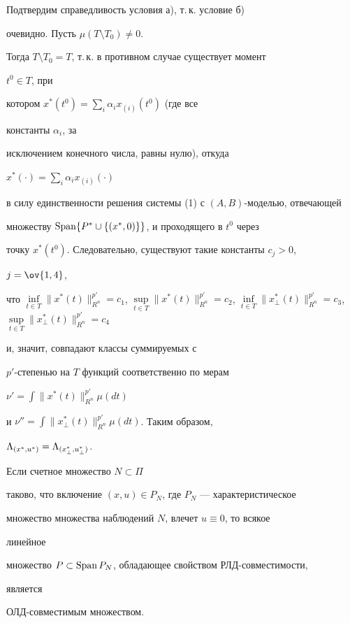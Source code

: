  


\begin{pf} 


Подтвердим справедливость условия а), т.\,к. условие б) 


очевидно. Пусть $\mu(T\setminus T_0)\ne0$. 


Тогда $T\setminus T_0=T$, т.\,к. в противном случае существует момент 


$t^0\in T$, при 


котором $x^*(t^0)=\sum\limits_i\alpha_i x_{(i)}(t^0)$ (где все 


константы $\alpha_i$, за 


исключением конечного числа, равны нулю), откуда 


$x^*(\cdot)=\sum\limits_i\alpha_i x_{(i)}(\cdot)$ 


в силу единственности решения системы (1) с $(A,B)$-моделью, отвечающей 


множеству $\operatorname{Span}\{P^*\cup\{(x^*,0)\}\}$, и проходящего в $t^0$ через 


точку $x^*(t^0)$. Следовательно, существуют такие константы $c_j>0$, 


$j=\ov{1,4}$, 


что $\inf\limits_{t\in T}\|x^*(t)\|^{p'}_{R^n}=c_1$, $\sup\limits_{t\in 


T}\|x^*(t)\|^{p'}_{R^n}=c_2$, $\inf\limits_{t\in 


T}\|x^*_\bot(t)\|^{p'}_{R^n}=c_3$, $\sup\limits_{t\in 


T}\|x^*_\bot(t)\|^{p'}_{R^n}=c_4$ 


и, значит, совпадают классы суммируемых с 


$p'$-степенью на $T$ функций соответственно по мерам 


$\nu'=\int\|x^*(t)\|^{p'}_{R^n}\mu(dt)$ 


и $\nu''=\int\|x^*_\bot(t)\|^{p'}_{R^n}\mu(dt)$. Таким образом, 


$\Lambda_{{(x^*_{},u^*_{})}}=\Lambda_{{(x^*_{\bot},u^*_{\bot})}}$. 


\end{pf} 


 


\begin{assrt} 


Если счетное множество $N\subset\Pi$ 


таково, что включение $(x,u)\in P_N$, где $P_N$ --- характеристическое 


множество множества наблюдений $N$, влечет $u\equiv0$, то всякое 


линейное 


множество $P\subset\operatorname{Span} P_N$, обладающее свойством РЛД-совместимости, 


является 


ОЛД-совместимым множеством. 


\end{assrt} 


